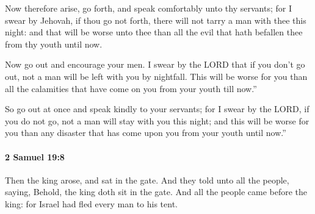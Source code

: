 			\begin{versebox}
					\item[BHS] 
					\item[ASV] Now therefore arise, go forth, and speak comfortably unto thy servants; for I swear by Jehovah, if thou go not forth, there will not tarry a man with thee this night: and that will be worse unto thee than all the evil that hath befallen thee from thy youth until now.
					\item[NIV] Now go out and encourage your men. I swear by the LORD that if you don’t go out, not a man will be left with you by nightfall. This will be worse for you than all the calamities that have come on you from your youth till now.”
					\item[NRSV] So go out at once and speak kindly to your servants; for I swear by the LORD, if you do not go, not a man will stay with you this night; and this will be worse for you than any disaster that has come upon you from your youth until now.”
			\end{versebox}

		\paragraph{2 Samuel 19:8} %
			\label{2SAMUEL-19-8}

			Then the king arose, and sat in the gate. And they told unto all the people, saying, Behold, the king doth sit in the gate. And all the people came before the king: for Israel had fled every man to his tent.

